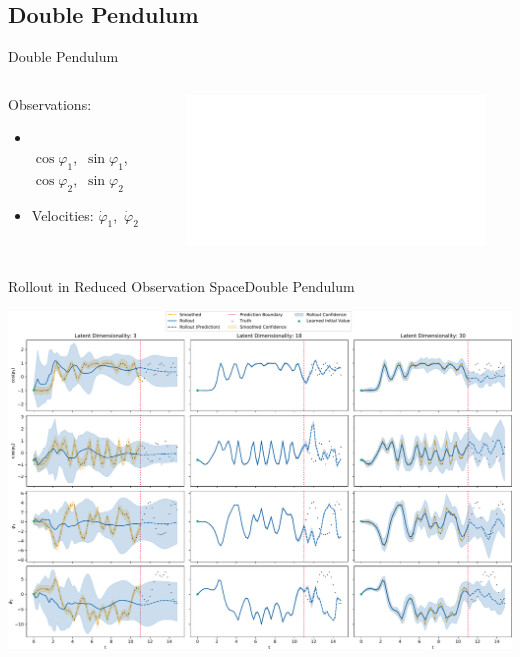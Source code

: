\documentclass[
	aspectratio=43,
	color={accentcolor=1c},
	logo=false,
	colorframetitle=true,
]{tudabeamer}
\begin{document}
		\subsection{Double Pendulum}
			\begin{frame}{Double Pendulum}
				\begin{columns}[c]
					\begin{column}{0.35\linewidth}
						Observations:
						\begin{itemize}
							\item {} \\
								\quad \(\cos\varphi_1\),\, \(\sin\varphi_1\), \\
								\quad \(\cos\varphi_2\),\, \(\sin\varphi_2\)
							\item Velocities: \(\dot{\varphi}_1\),\, \(\dot{\varphi}_2\)
						\end{itemize}
						\begin{center}
							\resizebox{0.85\linewidth}{!}{\tikzDoublePendulum}
						\end{center}
					\end{column}
					\begin{column}{0.65\linewidth}
						\begin{center}
							\includegraphics<2->[width=\linewidth]{figures/experiments/acrobot-gym/log-likelihood.pdf}
						\end{center}
					\end{column}
				\end{columns}
			\end{frame}

			\begin{frame}[c]{Rollout in Reduced Observation Space}{Double Pendulum}
				\vspace{-0.25cm}
				\begin{center}
					\includegraphics[width=0.875\linewidth]{figures/experiments/acrobot-gym/different-latent-dims-rollouts-reduced.pdf}
				\end{center}
			\end{frame}
\end{document}
